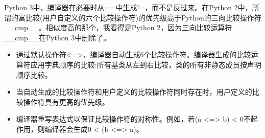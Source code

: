 \begin{tcolorbox}[breakable,enhanced jigsaw,colback=blue!5!white,colframe=blue!75!black,title={与Python的相似性}]
Python 3中，编译器在必要时从==中生成!=，而不是反过来。在Python 2中，所谓的富比较(用户自定义的六个比较操作符)的优先级高于Python的三向比较操作符\_\_cmp\_\_。相似度高的那个，我看得是Python 2，因为三向比较运算符\_\_cmp\_\_在Python 3中删除了。
\end{tcolorbox}	

\begin{tcolorbox}[breakable,enhanced jigsaw,colback=mygreen!5!white,colframe=mygreen!75!black,title={总结}]
\begin{itemize}
\item 
通过默认操作符<=>，编译器自动生成6个比较操作符。编译器生成的比较运算符应用字典顺序的比较:所有基类从左到右比较，类的所有非静态成员按声明顺序比较。

\item 
当自动生成的比较操作符和用户定义的比较操作符同时存在时，用户定义的比较操作符具有更高的优先级。

\item 
编译器重写表达式以保证比较操作符的对称性。例如，若(a <=> b) < 0不起作用，则编译器会生成0 < (b <=> a)。
\end{itemize}
\end{tcolorbox}	

\newpage
























